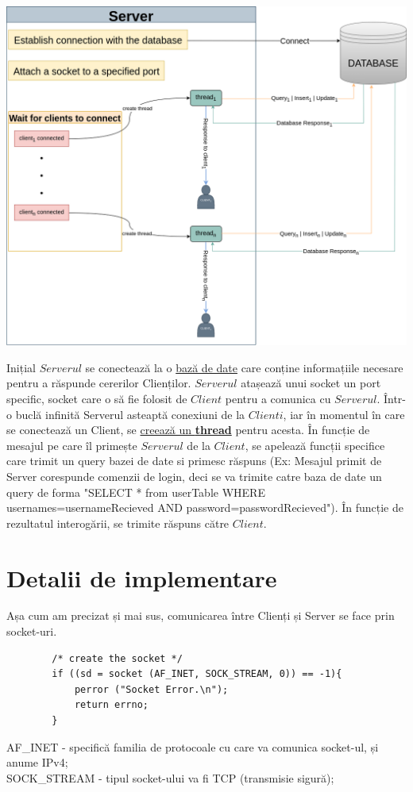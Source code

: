 \documentclass[runningheads]{llncs}
\begin{document}
	\begin{center}
		\includegraphics[scale=0.4]{diagram_server.png}
		\label{sec:server}
	\end{center}
	Inițial $Serverul$ se conectează la o \hyperref[sec:ServerDataBase]{bază de date} care conține informațiile necesare pentru a răspunde cererilor Clienților.
	$Serverul$ atașează unui socket un port specific, socket care o să fie folosit de $Client$ pentru a comunica cu $Serverul$. 
	Într-o buclă infinită Serverul asteaptă conexiuni de la $Clienti$, iar în momentul în care se conectează un Client, se \hyperlink{sec:ServerCreateThread}{creează un \textbf{thread}} pentru acesta.
	În funcție de mesajul pe care îl primește $Serverul$ de la $Client$, se apelează funcții specifice care trimit un query bazei de date si primesc răspuns
	(Ex: Mesajul primit de Server corespunde comenzii de login, deci se va trimite catre baza de date un query de forma 
	"SELECT * from userTable WHERE usernames=usernameRecieved AND password=passwordRecieved").
	În funcție de rezultatul interogării, se trimite răspuns către $Client$.
	
	\section{Detalii de implementare}
	Așa cum am precizat și mai sus, comunicarea între Clienți și Server se face prin socket-uri.
	\begin{verbatim}
		/* create the socket */
		if ((sd = socket (AF_INET, SOCK_STREAM, 0)) == -1){
			perror ("Socket Error.\n");
			return errno;
		}
	\end{verbatim} 
	AF\_INET - specifică familia de protocoale cu care va comunica socket-ul, și anume IPv4;\\
	SOCK\_STREAM - tipul socket-ului va fi TCP (transmisie sigură);\\
	
\end{document}
